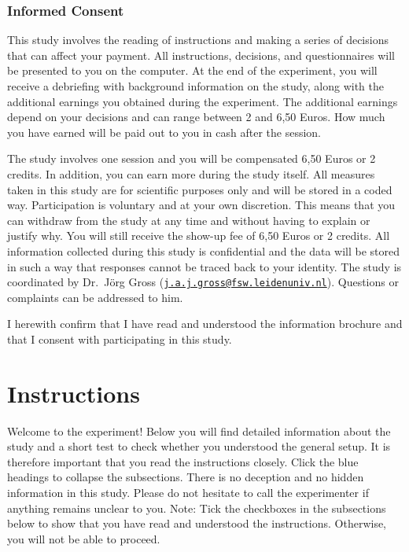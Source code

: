 \documentclass[man]{apa6}
\begin{document}
\hypertarget{informed-consent}{%
\subsubsection{Informed Consent}\label{informed-consent}}

This study involves the reading of instructions and making a series of
decisions that can affect your payment. All instructions, decisions, and
questionnaires will be presented to you on the computer. At the end of
the experiment, you will receive a debriefing with background
information on the study, along with the additional earnings you
obtained during the experiment. The additional earnings depend on your
decisions and can range between 2 and 6,50 Euros. How much you have
earned will be paid out to you in cash after the session.

The study involves one session and you will be compensated 6,50 Euros or
2 credits. In addition, you can earn more during the study itself. All
measures taken in this study are for scientific purposes only and will
be stored in a coded way. Participation is voluntary and at your own
discretion. This means that you can withdraw from the study at any time
and without having to explain or justify why. You will still receive the
show-up fee of 6,50 Euros or 2 credits. All information collected during
this study is confidential and the data will be stored in such a way
that responses cannot be traced back to your identity. The study is
coordinated by Dr.~Jörg Gross
(\href{mailto:j.a.j.gross@fsw.leidenuniv.nl}{\nolinkurl{j.a.j.gross@fsw.leidenuniv.nl}}).
Questions or complaints can be addressed to him.

I herewith confirm that I have read and understood the information
brochure and that I consent with participating in this study.

\hypertarget{instructions}{%
\section{Instructions}\label{instructions}}

Welcome to the experiment! Below you will find detailed information
about the study and a short test to check whether you understood the
general setup. It is therefore important that you read the instructions
closely. Click the blue headings to collapse the subsections. There is
no deception and no hidden information in this study. Please do not
hesitate to call the experimenter if anything remains unclear to you.
Note: Tick the checkboxes in the subsections below to show that you have
read and understood the instructions. Otherwise, you will not be able to
proceed.
\end{document}
